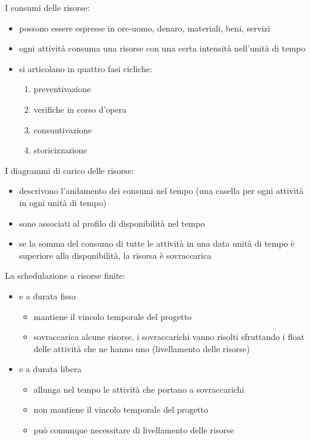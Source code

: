 \documentclass[answers, a4paper, 11pt]{exam}
\begin{document}
I consumi delle risorse:

\begin{itemize}
    \item possono essere espresse in ore-uomo, denaro, materiali, beni, servizi
    \item ogni attività consuma una risorse con una certa intensità nell'unità di tempo
    \item si articolano in quattro fasi cicliche:
    \begin{enumerate}
        \item preventivazione
        \item verifiche in corso d'opera
        \item consuntivazione
        \item storicizzazione
    \end{enumerate}
\end{itemize}

I diagrammi di carico delle risorse:

\begin{itemize}
    \item descrivono l'andamento dei consumi nel tempo (una casella per ogni attività in ogni unità di tempo)
    \item sono associati al profilo di disponibilità nel tempo
    \item se la somma del consumo di tutte le attività in una data unità di tempo è superiore alla disponibilità, la risorsa è sovraccarica
\end{itemize}

La schedulazione a risorse finite:
\begin{itemize}
    \item e a durata fissa
    \begin{itemize}
        \item mantiene il vincolo temporale del progetto
        \item sovraccarica alcune risorse, i sovraccarichi vanno risolti sfruttando i float delle attività che ne hanno uno (livellamento delle risorse)
    \end{itemize}
    \item e a durata libera
    \begin{itemize}
        \item allunga nel tempo le attività che portano a sovraccarichi
        \item non mantiene il vincolo temporale del progetto
        \item può comunque necessitare di livellamento delle risorse
    \end{itemize}
\end{itemize}
\end{document}
